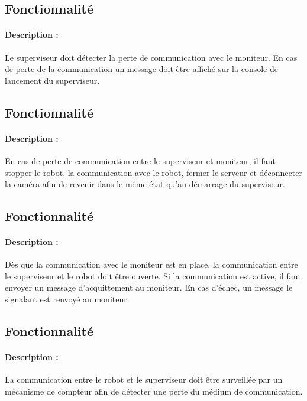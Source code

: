 \documentclass[11pt, a4paper]{paper}
\newcounter{cptreq}
\begin{document}
{{%
\subsection{Fonctionnalité \thecptreq *}

\paragraph{Description :} Le superviseur doit détecter la perte de communication avec le moniteur. En cas de perte de la communication un message doit être affiché sur la console de lancement du superviseur.

\subsection{Fonctionnalité \thecptreq *}

\paragraph{Description :} En cas de perte de communication entre le superviseur et moniteur, il faut stopper le robot,  la communication avec le robot, fermer le serveur et déconnecter la caméra afin de revenir dans le même état qu'au démarrage du superviseur.

{\color{black}
\subsection{Fonctionnalité \thecptreq *}

\paragraph{Description :} Dès que la communication avec le moniteur est en place, la communication entre le superviseur et le robot doit être ouverte. Si la communication est active, il faut envoyer un message d'acquittement au moniteur. En cas d'échec, un message le signalant est renvoyé au moniteur.

}
\subsection{Fonctionnalité \thecptreq }

\paragraph{Description :} La communication entre le robot et le superviseur doit être surveillée par un mécanisme de compteur afin de détecter une perte du médium de communication.

}}
\end{document}
